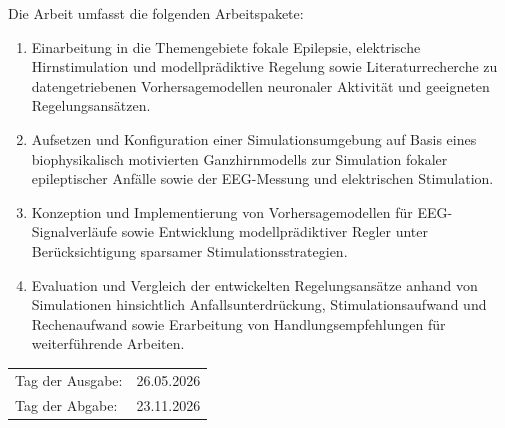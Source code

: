 Die Arbeit umfasst die folgenden Arbeitspakete:
\begin{enumerate}
    \item Einarbeitung in die Themengebiete fokale Epilepsie, elektrische Hirnstimulation und modellprädiktive Regelung sowie Literaturrecherche zu datengetriebenen Vorhersagemodellen neuronaler Aktivität und geeigneten Regelungsansätzen.
    \item Aufsetzen und Konfiguration einer Simulationsumgebung auf Basis eines biophysikalisch motivierten Ganzhirnmodells zur Simulation fokaler epileptischer Anfälle sowie der EEG-Messung und elektrischen Stimulation. 
    \item Konzeption und Implementierung von Vorhersagemodellen für EEG-Signalverläufe sowie Entwicklung modellprädiktiver Regler unter Berücksichtigung sparsamer Stimulationsstrategien.
     \item Evaluation und Vergleich der entwickelten Regelungsansätze anhand von Simulationen hinsichtlich Anfallsunterdrückung, Stimulationsaufwand und Rechenaufwand sowie Erarbeitung von Handlungsempfehlungen für weiterführende Arbeiten. 
\end{enumerate}

\begin{table}[h!]
    \begin{tabular}{l l}
    Tag der Ausgabe:    &   26.05.2026 \\
    Tag der Abgabe:     &   23.11.2026
    \end{tabular}
\end{table}